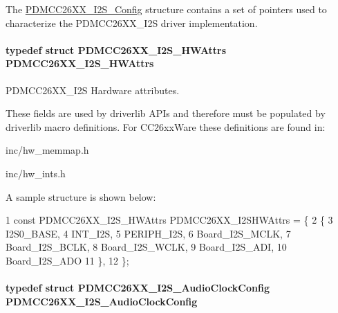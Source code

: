 The \hyperlink{struct_p_d_m_c_c26_x_x___i2_s___config}{P\+D\+M\+C\+C26\+X\+X\+\_\+\+I2\+S\+\_\+\+Config} structure contains a set of pointers used to characterize the P\+D\+M\+C\+C26\+X\+X\+\_\+\+I2\+S driver implementation. 

\paragraph[{P\+D\+M\+C\+C26\+X\+X\+\_\+\+I2\+S\+\_\+\+H\+W\+Attrs}]{\setlength{\rightskip}{0pt plus 5cm}typedef struct {\bf P\+D\+M\+C\+C26\+X\+X\+\_\+\+I2\+S\+\_\+\+H\+W\+Attrs}  {\bf P\+D\+M\+C\+C26\+X\+X\+\_\+\+I2\+S\+\_\+\+H\+W\+Attrs}}\label{_p_d_m_c_c26_x_x__util_8h_a8e141a2dcd47376258fe58167a990027}


P\+D\+M\+C\+C26\+X\+X\+\_\+\+I2\+S Hardware attributes. 

These fields are used by driverlib A\+P\+Is and therefore must be populated by driverlib macro definitions. For C\+C26xx\+Ware these definitions are found in\+:
\begin{DoxyItemize}
\item inc/hw\+\_\+memmap.\+h
\item inc/hw\+\_\+ints.\+h
\end{DoxyItemize}

A sample structure is shown below\+: 
\begin{DoxyCode}
1 const PDMCC26XX\_I2S\_HWAttrs PDMCC26XX\_I2SHWAttrs = \{
2     \{
3         I2S0\_BASE,
4         INT\_I2S,
5         PERIPH\_I2S,
6         Board\_I2S\_MCLK,
7         Board\_I2S\_BCLK,
8         Board\_I2S\_WCLK,
9         Board\_I2S\_ADI,
10         Board\_I2S\_ADO
11     \},
12 \};
\end{DoxyCode}
\paragraph[{P\+D\+M\+C\+C26\+X\+X\+\_\+\+I2\+S\+\_\+\+Audio\+Clock\+Config}]{\setlength{\rightskip}{0pt plus 5cm}typedef struct {\bf P\+D\+M\+C\+C26\+X\+X\+\_\+\+I2\+S\+\_\+\+Audio\+Clock\+Config}  {\bf P\+D\+M\+C\+C26\+X\+X\+\_\+\+I2\+S\+\_\+\+Audio\+Clock\+Config}}\label{_p_d_m_c_c26_x_x__util_8h_a8def7a5770e8bb7c904727e21cdf1fb9}



